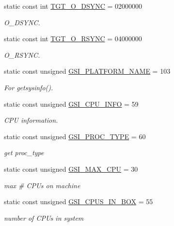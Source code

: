 \begin{Indent}{\bf }
\begin{DoxyCompactItemize}
static const int \hyperlink{classAlphaTru64_ac8d84ac6abb2d868443e4559bed55ebe}{TGT\_\-O\_\-DSYNC} = 02000000
\begin{DoxyCompactList}\small\item\em O\_\-DSYNC. \item\end{DoxyCompactList}\item 
static const int \hyperlink{classAlphaTru64_a1b4245158ffbfdc36ae7d6e666ffc261}{TGT\_\-O\_\-RSYNC} = 04000000
\begin{DoxyCompactList}\small\item\em O\_\-RSYNC. \item\end{DoxyCompactList}\item 
static const unsigned \hyperlink{classAlphaTru64_ac2412600f242b3062b887ef0ec4b4908}{GSI\_\-PLATFORM\_\-NAME} = 103
\begin{DoxyCompactList}\small\item\em For getsysinfo(). \item\end{DoxyCompactList}\item 
static const unsigned \hyperlink{classAlphaTru64_ad89f91e0925845385f177d93e4ef7985}{GSI\_\-CPU\_\-INFO} = 59
\begin{DoxyCompactList}\small\item\em CPU information. \item\end{DoxyCompactList}\item 
static const unsigned \hyperlink{classAlphaTru64_a3048b7c97d8a7e86854cdb73520560d0}{GSI\_\-PROC\_\-TYPE} = 60
\begin{DoxyCompactList}\small\item\em get proc\_\-type \item\end{DoxyCompactList}\item 
static const unsigned \hyperlink{classAlphaTru64_a14ed8f49156face38fb0dee35125148d}{GSI\_\-MAX\_\-CPU} = 30
\begin{DoxyCompactList}\small\item\em max \# CPUs on machine \item\end{DoxyCompactList}\item 
static const unsigned \hyperlink{classAlphaTru64_a4df912c77419619f6f242873f65b0045}{GSI\_\-CPUS\_\-IN\_\-BOX} = 55
\begin{DoxyCompactList}\small\item\em number of CPUs in system \item\end{DoxyCompactList}\item 

\end{DoxyCompactItemize}
\end{Indent}
